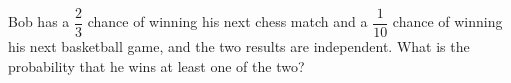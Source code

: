 Bob has a $\dfrac{2}{3}$ chance of winning his next chess match and a $\dfrac{1}{10}$ chance of winning his next basketball game, and the two results are independent. What is the probability that he wins at least one of the two?
